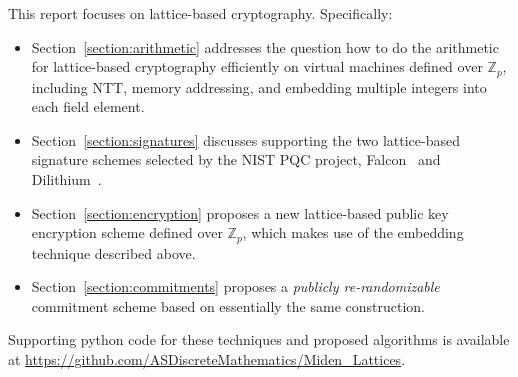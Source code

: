 This report focuses on lattice-based cryptography. Specifically:
\begin{itemize}
\item Section~\ref{section:arithmetic} addresses the question how to do the arithmetic for lattice-based cryptography efficiently on virtual machines defined over $\mathbb{Z}_p$, including NTT, memory addressing, and embedding multiple integers into each field element.
\item Section~\ref{section:signatures} discusses supporting the two lattice-based signature schemes selected by the NIST PQC project, Falcon~\cite{falcon} and Dilithium~\cite{dilithium}.
\item Section~\ref{section:encryption} proposes a new lattice-based public key encryption scheme defined over $\mathbb{Z}_p$, which makes use of the embedding technique described above.
\item Section~\ref{section:commitments} proposes a \emph{publicly re-randomizable} commitment scheme based on essentially the same construction.
\end{itemize}
Supporting python code for these techniques and proposed algorithms is available at \url{https://github.com/ASDiscreteMathematics/Miden_Lattices}.